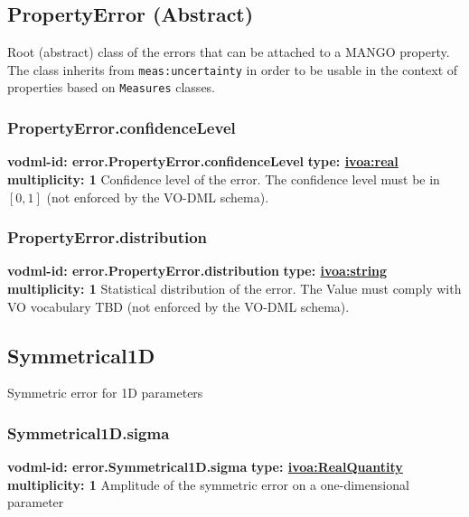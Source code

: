   \subsection{PropertyError (Abstract)}
    \label{sect:error.PropertyError}
    Root (abstract) class of the errors that can be attached to a MANGO property. The class inherits from \texttt{meas:uncertainty} in order to be usable in the context of properties based on \texttt{Measures} classes.

    \subsubsection{PropertyError.confidenceLevel}
    \textbf{vodml-id: error.PropertyError.confidenceLevel} \newline
    \textbf{type: \hyperref[sect:ivoa]{ivoa:real}} \newline
    \textbf{multiplicity: 1} \newline
    Confidence level of the error. The confidence level must be in $[0, 1]$ (not enforced by the VO-DML schema).

    \subsubsection{PropertyError.distribution}
    \textbf{vodml-id: error.PropertyError.distribution} \newline
    \textbf{type: \hyperref[sect:ivoa]{ivoa:string}} \newline
    \textbf{multiplicity: 1} \newline
    Statistical distribution of the error. The Value must comply with VO vocabulary TBD (not enforced by the VO-DML schema).

  \subsection{Symmetrical1D}
    \label{sect:error.Symmetrical1D}
    Symmetric error for 1D parameters

    \subsubsection{Symmetrical1D.sigma}
    \textbf{vodml-id: error.Symmetrical1D.sigma} \newline
    \textbf{type: \hyperref[sect:ivoa]{ivoa:RealQuantity}} \newline
    \textbf{multiplicity: 1} \newline
    Amplitude of the symmetric error on a one-dimensional parameter

